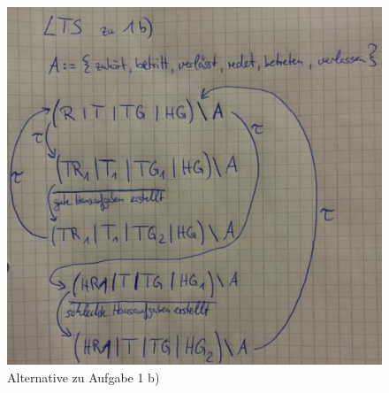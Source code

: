 \begin{figure}[h]
\centering
\includegraphics[width=15cm]{20140515_130354.jpg}
\caption{Alternative zu Aufgabe 1 b)}
\label{fig:B3}
\end{figure}
%	